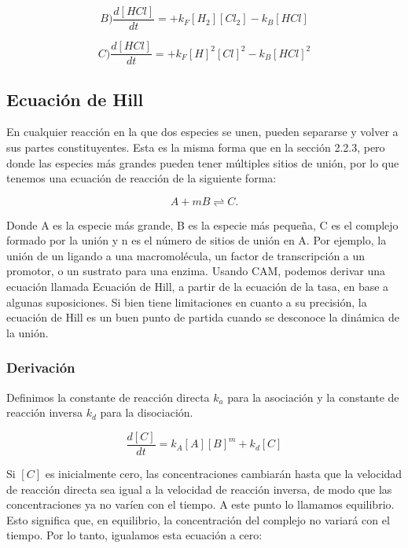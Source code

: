 \documentclass[11pt, letterpaper, spanish]{article}
\begin{document}
{    \begin{equation}
        B)\frac{d [HCl]}{d t}=+k_F[H_2][{Cl}_2]-k_B[HCl]
    \end{equation}

    \begin{equation}
        C)\frac{d [HCl]}{d t}=+k_F{[H]}^2{[Cl]}^2-k_B[HCl]^2
    \end{equation}

    \subsection{ Ecuación de Hill}
    \par{En cualquier reacción en la que dos especies se unen, pueden separarse y volver a sus partes constituyentes. Esta es la misma forma que en la sección 2.2.3, pero donde las especies más grandes pueden tener múltiples sitios de unión, por lo que tenemos una ecuación de reacción de la siguiente forma:}
    
    \begin{equation}
    A+mB \rightleftharpoons C.
    \end{equation}

    \par{Donde A es la especie más grande, B es la especie más pequeña, C es el complejo formado por la unión y n es el número de sitios de unión en A. Por ejemplo, la unión de un ligando a una macromolécula, un factor de transcripción a un promotor, o un sustrato para una enzima. Usando CAM, podemos derivar una ecuación llamada Ecuación de Hill, a partir de la ecuación de la tasa, en base a algunas suposiciones. Si bien tiene limitaciones en cuanto a su precisión, la ecuación de Hill es un buen punto de partida cuando se desconoce la dinámica de la unión.}

    \subsubsection{Derivación}
    
    \par{Definimos la constante de reacción directa $k_a$ para la asociación y la constante de reacción inversa $k_d$ para la disociación.}

    \begin{equation}
        \frac{d [C]}{d t}=k_A{[A]}[B]^m+k_d[C]
    \end{equation}

    \par{Si $[C]$ es inicialmente cero, las concentraciones cambiarán hasta que la velocidad de reacción directa sea igual a la velocidad de reacción inversa, de modo que las concentraciones ya no varíen con el tiempo. A este punto lo llamamos equilibrio. Esto significa que, en equilibrio, la concentración del complejo no variará con el tiempo. Por lo tanto, igualamos esta ecuación a cero:}

}
\end{document}
